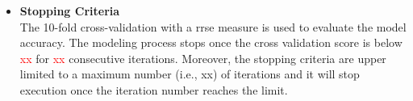 \begin{itemize}

\item \textbf{Stopping Criteria} \\
The 10-fold cross-validation with a \gls{rrse} measure is used to evaluate the model accuracy. The modeling process stops once the cross validation score is below \textcolor{red}{xx} for \textcolor{red}{xx} consecutive iterations. Moreover, the stopping criteria are upper limited to a maximum number (i.e., xx) of iterations and it will stop execution once the iteration number reaches the limit.




\end{itemize}











